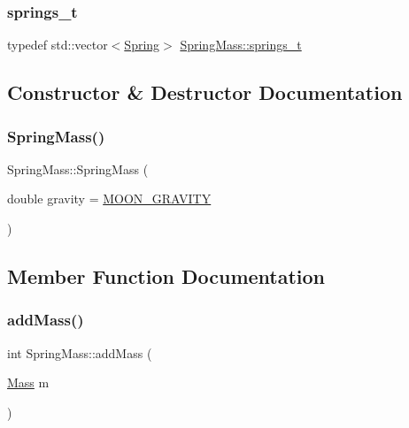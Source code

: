 \subsubsection{\texorpdfstring{springs\+\_\+t}{springs\_t}}
{\footnotesize\ttfamily typedef std\+::vector$<$\hyperlink{classSpring}{Spring}$>$ \hyperlink{classSpringMass_a31c09e1ecad3d85488d557b76eb633e5}{Spring\+Mass\+::springs\+\_\+t}\hspace{0.3cm}{\ttfamily [protected]}}



\subsection{Constructor \& Destructor Documentation}
\mbox{\label{classSpringMass_a5c94ec5d3adf73a7b3b7e9dd10045132}} 
\subsubsection{\texorpdfstring{Spring\+Mass()}{SpringMass()}}
{\footnotesize\ttfamily Spring\+Mass\+::\+Spring\+Mass (\begin{DoxyParamCaption}\item[{double}]{gravity = {\ttfamily \hyperlink{springmass_8h_a03ad3bae72a0ac7965460a63fd454f44}{M\+O\+O\+N\+\_\+\+G\+R\+A\+V\+I\+TY}} }\end{DoxyParamCaption})}



\subsection{Member Function Documentation}
\mbox{\label{classSpringMass_ac5185db5ea4078e3af82b7031d893302}} 
\subsubsection{\texorpdfstring{add\+Mass()}{addMass()}}
{\footnotesize\ttfamily int Spring\+Mass\+::add\+Mass (\begin{DoxyParamCaption}\item[{\hyperlink{classMass}{Mass}}]{m }\end{DoxyParamCaption})}


